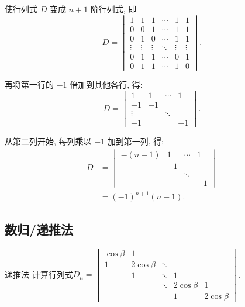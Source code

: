\begin{solution}
    使行列式 $D$ 变成 $n+1$ 阶行列式, 即
    \[ D=\begin{vmatrix}
            1      & 1      & 1      & \cdots & 1      & 1      \\
            0      & 0      & 1      & \cdots & 1      & 1      \\
            0      & 1      & 0      & \cdots & 1      & 1      \\
            \vdots & \vdots & \vdots & \ddots & \vdots & \vdots \\
            0      & 1      & 1      & \cdots & 0      & 1      \\
            0      & 1      & 1      & \cdots & 1      & 0
        \end{vmatrix}. \]

    再将第一行的 $-1$ 倍加到其他各行, 得:
    \[ D =\begin{vmatrix}
            1      & 1  & \cdots & 1  \\
            -1     & -1 &        &    \\
            \vdots &    & \ddots &    \\
            -1     &    &        & -1
        \end{vmatrix}. \]

    从第二列开始, 每列乘以 $-1$ 加到第一列, 得:
    \begin{align*}
        D & =\begin{vmatrix}
                 -(n-1) & 1  & \cdots & 1  \\
                        & -1 &        &    \\
                        &    & \ddots &    \\
                        &    &        & -1
             \end{vmatrix} \\
          & =(-1)^{n+1}(n-1).
    \end{align*}
\end{solution}

\subsection{数归/递推法}

\begin{example}{}{递推法}
    计算行列式$D_n=\begin{vmatrix}
            \cos \beta & 1            &        &              &              \\
            1          & 2 \cos \beta & \ddots &              &              \\
                       & 1            & \ddots & 1            &              \\
                       &              & \ddots & 2 \cos \beta & 1            \\
                       &              &        & 1            & 2 \cos \beta
        \end{vmatrix}$.
\end{example}

